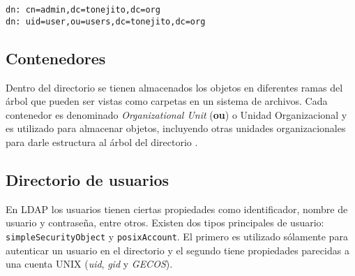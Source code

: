 {
\normalsize
\linespread{1}
\begin{center}
  \texttt{dn: cn=admin,dc=tonejito,dc=org}
  \\
  \texttt{dn: uid=user,ou=users,dc=tonejito,dc=org}
\end{center}
}

  \subsection{Contenedores}

Dentro del directorio se tienen almacenados los objetos en diferentes ramas del \'{a}rbol que pueden ser vistas como carpetas en un sistema de archivos. Cada contenedor es denominado \textit{Organizational Unit} (\textbf{ou}) o Unidad Organizacional y es utilizado para almacenar objetos, incluyendo otras unidades organizacionales para darle estructura al \'{a}rbol del directorio \cite{_appendix_????}.


  \subsection {Directorio de usuarios}

En \textsc{LDAP}  los usuarios tienen ciertas propiedades como identificador, nombre de usuario y contrase\~{n}a, entre otros. Existen dos tipos principales de usuario: \texttt{simpleSecurityObject} y \texttt{posixAccount}. El primero es utilizado s\'{o}lamente para autenticar un usuario en el directorio y el segundo tiene propiedades parecidas a una cuenta \textsc{UNIX} (\textit{uid}, \textit{gid} y \textit{GECOS}).


